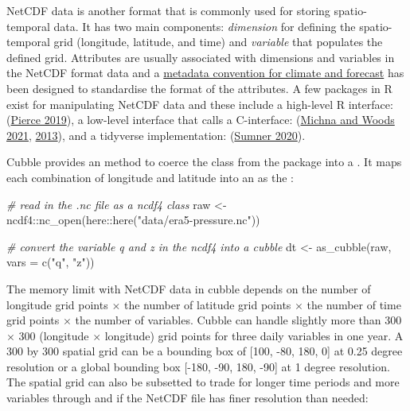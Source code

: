 \documentclass{article}
\newenvironment{Shaded}{\begin{snugshade}}{\end{snugshade}}
\newcommand{\AttributeTok}[1]{\textcolor[rgb]{0.77,0.63,0.00}{#1}}
\newcommand{\CommentTok}[1]{\textcolor[rgb]{0.56,0.35,0.01}{\textit{#1}}}
\newcommand{\FunctionTok}[1]{\textcolor[rgb]{0.00,0.00,0.00}{#1}}
\newcommand{\NormalTok}[1]{#1}
\newcommand{\OtherTok}[1]{\textcolor[rgb]{0.56,0.35,0.01}{#1}}
\newcommand{\SpecialCharTok}[1]{\textcolor[rgb]{0.00,0.00,0.00}{#1}}
\newcommand{\StringTok}[1]{\textcolor[rgb]{0.31,0.60,0.02}{#1}}
\begin{document}
NetCDF data is another format that is commonly used for storing spatio-temporal data. It has two main components: \emph{dimension} for defining the spatio-temporal grid (longitude, latitude, and time) and \emph{variable} that populates the defined grid. Attributes are usually associated with dimensions and variables in the NetCDF format data and a \href{http://cfconventions.org/}{metadata convention for climate and forecast} has been designed to standardise the format of the attributes. A few packages in R exist for manipulating NetCDF data and these include a high-level R interface:  (\protect\hyperlink{ref-ncdf4}{Pierce 2019}), a low-level interface that calls a C-interface:  (\protect\hyperlink{ref-rnetcdf}{Michna and Woods 2021}, \protect\hyperlink{ref-michna2013rnetcdf}{2013}), and a tidyverse implementation:  (\protect\hyperlink{ref-tidync}{Sumner 2020}).

Cubble provides an  method to coerce the  class from the  package into a . It maps each combination of longitude and latitude into an  as the :

\begin{Shaded}
\begin{Highlighting}[]
\CommentTok{\# read in the .nc file as a ncdf4 class}
\NormalTok{raw }\OtherTok{\textless{}{-}}\NormalTok{ ncdf4}\SpecialCharTok{::}\FunctionTok{nc\_open}\NormalTok{(here}\SpecialCharTok{::}\FunctionTok{here}\NormalTok{(}\StringTok{"data/era5{-}pressure.nc"}\NormalTok{))}

\CommentTok{\# convert the variable q and z in the ncdf4 into a cubble}
\NormalTok{dt }\OtherTok{\textless{}{-}} \FunctionTok{as\_cubble}\NormalTok{(raw, }\AttributeTok{vars =} \FunctionTok{c}\NormalTok{(}\StringTok{"q"}\NormalTok{, }\StringTok{"z"}\NormalTok{))}
\end{Highlighting}
\end{Shaded}

The memory limit with NetCDF data in cubble depends on the number of longitude grid points \(\times\) the number of latitude grid points \(\times\) the number of time grid points \(\times\) the number of variables. Cubble can handle slightly more than 300 \(\times\) 300 (longitude \(\times\) longitude) grid points for three daily variables in one year. A 300 by 300 spatial grid can be a bounding box of {[}100, -80, 180, 0{]} at 0.25 degree resolution or a global bounding box {[}-180, -90, 180, -90{]} at 1 degree resolution. The spatial grid can also be subsetted to trade for longer time periods and more variables through  and  if the NetCDF file has finer resolution than needed:
\end{document}

